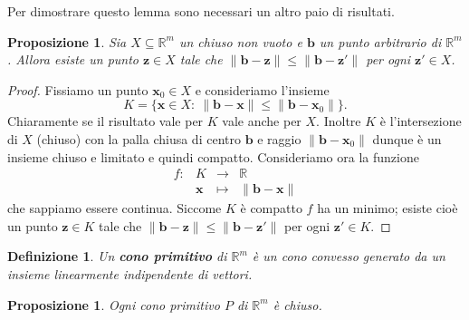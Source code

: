 \documentclass[italian, 12pt, reqno]{article}
\theoremstyle{myteo}
\newtheorem{proposition}[theorem]{Proposizione}
\newtheorem{definition}[theorem]{Definizione}
\numberwithin{equation}{section}
\begin{document}
Per dimostrare questo lemma sono necessari un altro paio di risultati.

\begin{proposition}
  \label{prop:closed_nearest_point}
  Sia \(X\subseteq \mathbb{R}^m\) un chiuso non vuoto e \(\mathbf{b}\) un punto arbitrario di \(\mathbb{R}^m\).
  Allora esiste un punto \(\mathbf{z}\in X\) tale che \(\|\mathbf{b}-\mathbf{z}\| \le \|\mathbf{b} - \mathbf{z}'\|\) per ogni \(\mathbf{z}'\in X\).
\end{proposition}

\begin{proof}
  Fissiamo un punto \(\mathbf{x}_0\in X\) e consideriamo l'insieme
  \[K=\big\{\mathbf{x}\in X\colon\ \|\mathbf{b} - \mathbf{x}\| \le \|\mathbf{b} - \mathbf{x}_0\|\big\}.\]
  Chiaramente se il risultato vale per \(K\) vale anche per \(X\).
  Inoltre \(K\) è l'intersezione di \(X\) (chiuso) con la palla chiusa di centro \(\mathbf{b}\) e raggio \(\|\mathbf{b} - \mathbf{x}_0\|\) dunque è un insieme chiuso e limitato e quindi compatto.
  Consideriamo ora la funzione
  \begin{equation*}
    \begin{array}{crcl}
      f\colon & K & \to & \mathbb{R}\\
              & \mathbf{x} & \mapsto & \|\mathbf{b} - \mathbf{x}\|
    \end{array}
  \end{equation*}
  che sappiamo essere continua.
  Siccome \(K\) è compatto \(f\) ha un minimo; esiste cioè un punto \(\mathbf{z}\in K\) tale che \(\|\mathbf{b} - \mathbf{z}\| \le \|\mathbf{b} - \mathbf{z}'\|\) per ogni \(\mathbf{z}'\in K\).
\end{proof}

\begin{definition}
  \label{def:cono_primitivo}
  Un \textbf{cono primitivo} di \(\mathbb{R}^m\) è un cono convesso generato da un insieme \emph{linearmente indipendente} di vettori.
\end{definition}

\begin{proposition}
  \label{prop:coni_primitivi_chiusi}
  Ogni cono primitivo \(P\) di \(\mathbb{R}^m\) è chiuso.
\end{proposition}
\end{document}
